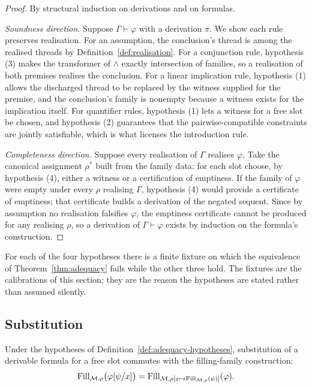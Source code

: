 \begin{proof}
By structural induction on derivations and on formulas.

\emph{Soundness direction.}  Suppose $\Gamma\vdash\varphi$ with a derivation $\pi$.  We show
each rule preserves realisation.  For an assumption, the conclusion's thread is among the
realised threads by Definition~\ref{def:realisation}.  For a conjunction rule, hypothesis
(3) makes the transformer of $\wedge$ exactly intersection of families, so a realisation
of both premises realises the conclusion.  For a linear implication rule, hypothesis (1)
allows the discharged thread to be replaced by the witness supplied for the premise, and
the conclusion's family is nonempty because a witness exists for the implication itself.
For quantifier rules, hypothesis (1) lets a witness for a free slot be chosen, and
hypothesis (2) guarantees that the pairwise-compatible constraints are jointly
satisfiable, which is what licenses the introduction rule.

\emph{Completeness direction.}  Suppose every realisation of $\Gamma$ realises $\varphi$.
Take the canonical assignment $\rho^{\ast}$ built from the family data: for each slot
choose, by hypothesis (4), either a witness or a certification of emptiness.  If the
family of $\varphi$ were empty under every $\rho$ realising $\Gamma$, hypothesis (4) would
provide a certificate of emptiness; that certificate builds a derivation of the negated
sequent.  Since by assumption no realisation falsifies $\varphi$, the emptiness certificate
cannot be produced for any realising $\rho$, so a derivation of
$\Gamma\vdash\varphi$ exists by induction on the formula's construction.
\end{proof}

\begin{calibration}\label{cal:adequacy-fails}
For each of the four hypotheses there is a finite fixture on which the equivalence of
Theorem~\ref{thm:adequacy} fails while the other three hold.  The fixtures are the
calibrations of this section; they are the reason the hypotheses are stated rather than
assumed silently.
\end{calibration}

\subsection{Substitution}

\begin{theorem}\label{thm:substitution-natural}
Under the hypotheses of Definition~\ref{def:adequacy-hypotheses}, substitution of a
derivable formula for a free slot commutes with the filling-family construction:
\[
  \operatorname{Fill}_{\mathcal M,\rho}\bigl(\varphi[\psi/x]\bigr)
  =
  \operatorname{Fill}_{\mathcal M,\rho[x\mapsto \operatorname{Fill}_{\mathcal M,\rho}(\psi)]}(\varphi).
\]
\end{theorem}

